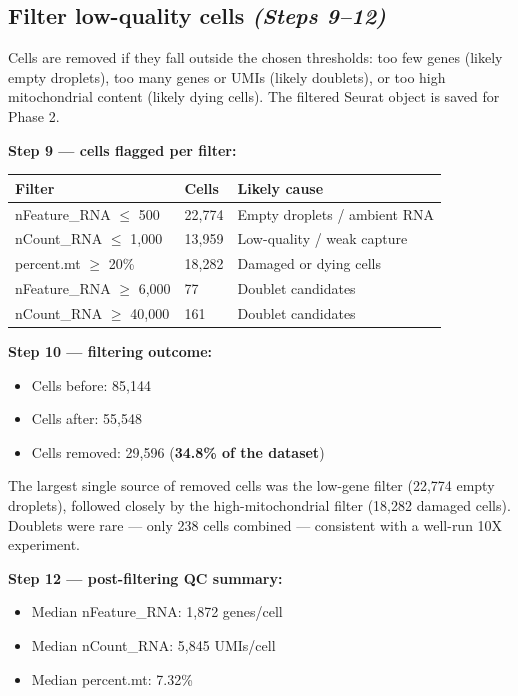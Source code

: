 \documentclass[11pt, a4paper]{article}
\begin{document}
\subsection{Filter low-quality cells \small\normalfont\textit{(Steps 9–12)}}
Cells are removed if they fall outside the chosen thresholds:
too few genes (likely empty droplets), too many genes or UMIs (likely doublets),
or too high mitochondrial content (likely dying cells).
The filtered Seurat object is saved for Phase 2.

\textbf{Step 9 — cells flagged per filter:}

\medskip
\noindent
\begin{tabular}{@{}p{4.5cm}p{2cm}p{6cm}@{}}
\toprule
\textbf{Filter} & \textbf{Cells} & \textbf{Likely cause} \\
\midrule
nFeature\_RNA $\leq$ 500  & 22,774 & Empty droplets / ambient RNA \\
nCount\_RNA $\leq$ 1,000  & 13,959 & Low-quality / weak capture \\
percent.mt $\geq$ 20\%    & 18,282 & Damaged or dying cells \\
nFeature\_RNA $\geq$ 6,000 & 77    & Doublet candidates \\
nCount\_RNA $\geq$ 40,000  & 161   & Doublet candidates \\
\bottomrule
\end{tabular}

\medskip
\textbf{Step 10 — filtering outcome:}
\begin{itemize}[nosep]
  \item Cells before: 85,144
  \item Cells after: 55,548
  \item Cells removed: 29,596 (\textbf{34.8\% of the dataset})
\end{itemize}

The largest single source of removed cells was the low-gene filter (22,774 empty droplets),
followed closely by the high-mitochondrial filter (18,282 damaged cells).
Doublets were rare — only 238 cells combined — consistent with a well-run 10X experiment.

\textbf{Step 12 — post-filtering QC summary:}
\begin{itemize}[nosep]
  \item Median nFeature\_RNA: 1,872 genes/cell
  \item Median nCount\_RNA: 5,845 UMIs/cell
  \item Median percent.mt: 7.32\%
\end{itemize}
\end{document}
